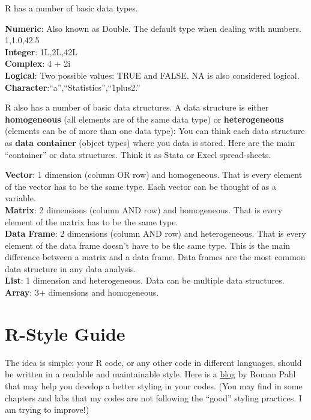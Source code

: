 \documentclass[
]{book}
\begin{document}
R has a number of basic data types.

\textbf{Numeric}: Also known as Double. The default type when dealing with numbers. 1,1.0,42.5\\
\textbf{Integer}: 1L,2L,42L\\
\textbf{Complex}: 4 + 2i\\
\textbf{Logical}: Two possible values: TRUE and FALSE. NA is also considered logical.\\
\textbf{Character}:``a'',``Statistics'',``1plus2.''

R also has a number of basic data structures. A data structure is either \textbf{homogeneous} (all elements are of the same data type) or \textbf{heterogeneous} (elements can be of more than one data type): You can think each data structure as \textbf{data container} (object types) where you data is stored. Here are the main ``container'' or data structures. Think it as Stata or Excel spread-sheets.

\textbf{Vector}: 1 dimension (column OR row) and homogeneous. That is every element of the vector has to be the same type. Each vector can be thought of as a variable.\\
\textbf{Matrix}: 2 dimensions (column AND row) and homogeneous. That is every element of the matrix has to be the same type.\\
\textbf{Data Frame}: 2 dimensions (column AND row) and heterogeneous. That is every element of the data frame doesn't have to be the same type. This is the main difference between a matrix and a data frame. Data frames are the most common data structure in any data analysis.\\
\textbf{List}: 1 dimension and heterogeneous. Data can be multiple data structures.\\
\textbf{Array}: 3+ dimensions and homogeneous.

\hypertarget{r-style-guide}{%
\section{R-Style Guide}\label{r-style-guide}}

The idea is simple: your R code, or any other code in different languages, should be written in a readable and maintainable style. Here is a \href{https://rpahl.github.io/r-some-blog/posts/r-style-guide/}{blog} by Roman Pahl that may help you develop a better styling in your codes. (You may find in some chapters and labs that my codes are not following the ``good'' styling practices. I am trying to improve!)
\end{document}
